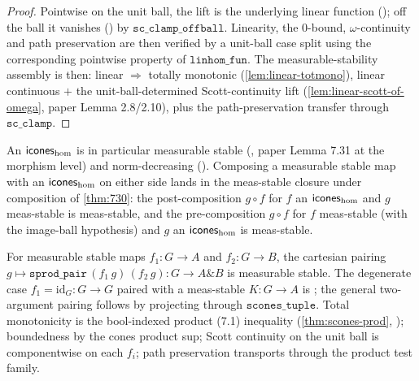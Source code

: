 \begin{proof}
Pointwise on the unit ball, the lift is the underlying linear function
();
off the ball it vanishes
()
by $\texttt{sc\_clamp\_offball}$. Linearity, the $0$-bound, $\omega$-continuity
and path preservation are then verified by a unit-ball case split using
the corresponding pointwise property of $\texttt{linhom\_fun}$. The
measurable-stability assembly is then: linear $\Rightarrow$ totally
monotonic (\autoref{lem:linear-totmono}), linear continuous $+$ the
unit-ball-determined Scott-continuity lift
(\autoref{lem:linear-scott-of-omega}, paper Lemma 2.8/2.10), plus the
path-preservation transfer through $\texttt{sc\_clamp}$.
\end{proof}

\begin{lemma}%
\label{lem:meas-stable-comp}
\rocqok
{}\rocqok
{}
An $\mathsf{icones}_{\mathrm{hom}}$ is in particular measurable stable
(, paper Lemma 7.31 at
the morphism level) and norm-decreasing
(). Composing a
measurable stable map with an $\mathsf{icones}_{\mathrm{hom}}$ on either side
lands in the meas-stable closure under composition of
\autoref{thm:730}: the post-composition
$g \circ f$ for $f$ an $\mathsf{icones}_{\mathrm{hom}}$ and $g$ meas-stable is
meas-stable, and the pre-composition $g \circ f$ for $f$ meas-stable
(with the image-ball hypothesis) and $g$ an
$\mathsf{icones}_{\mathrm{hom}}$ is meas-stable.
\end{lemma}

\begin{lemma}\label{lem:spair-meas-stable}
\rocqok
{}\rocqok
{}
For measurable stable maps $f_1 : G \to A$ and $f_2 : G \to B$, the
cartesian pairing $g \mapsto \texttt{sprod\_pair}\,(f_1\,g)\,(f_2\,g)
: G \to A \mathbin{\&} B$ is measurable stable. The degenerate case
$f_1 = \mathrm{id}_G : G \to G$ paired with a meas-stable $K : G \to A$
is
; the
general two-argument pairing
 follows by
projecting through $\texttt{scones\_tuple}$. Total monotonicity is the
bool-indexed product (7.1) inequality (\autoref{thm:scones-prod},
); boundedness by
the cones product sup; Scott continuity on the unit ball is
componentwise on each $f_i$; path preservation transports through the
product test family.
\end{lemma}


